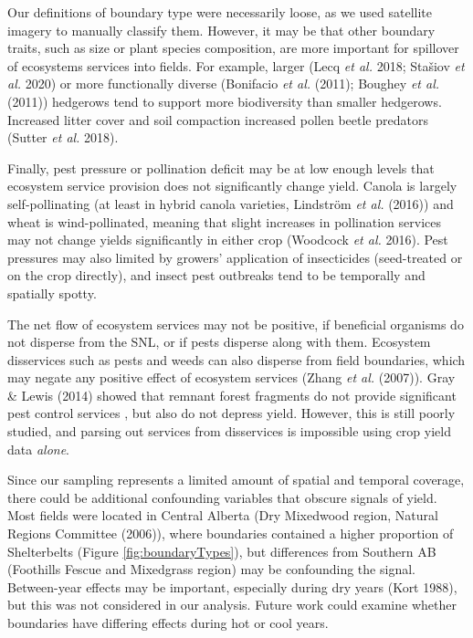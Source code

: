 \documentclass[]{elsarticle} %
\begin{document}
Our definitions of boundary type were necessarily loose, as we used satellite imagery to manually classify them.
However, it may be that other boundary traits, such as size or plant species composition, are more important for spillover of ecosystems services into fields.
For example, larger (Lecq \emph{et al.} 2018; Stašiov \emph{et al.} 2020) or more functionally diverse (Bonifacio \emph{et al.} (2011); Boughey \emph{et al.} (2011)) hedgerows tend to support more biodiversity than smaller hedgerows.
Increased litter cover and soil compaction increased pollen beetle predators (Sutter \emph{et al.} 2018).

Finally, pest pressure or pollination deficit may be at low enough levels that ecosystem service provision does not significantly change yield.
Canola is largely self-pollinating (at least in hybrid canola varieties, Lindström \emph{et al.} (2016)) and wheat is wind-pollinated, meaning that slight increases in pollination services may not change yields significantly in either crop (Woodcock \emph{et al.} 2016).
Pest pressures may also limited by growers' application of insecticides (seed-treated or on the crop directly), and insect pest outbreaks tend to be temporally and spatially spotty.

The net flow of ecosystem services may not be positive, if beneficial organisms do not disperse from the SNL, or if pests disperse along with them.
Ecosystem disservices such as pests and weeds can also disperse from field boundaries, which may negate any positive effect of ecosystem services (Zhang \emph{et al.} (2007)).
Gray \& Lewis (2014) showed that remnant forest fragments do not provide significant pest control services , but also do not depress yield.
However, this is still poorly studied, and parsing out services from disservices is impossible using crop yield data \emph{alone}.

Since our sampling represents a limited amount of spatial and temporal coverage, there could be additional confounding variables that obscure signals of yield.
Most fields were located in Central Alberta (Dry Mixedwood region, Natural Regions Committee (2006)), where boundaries contained a higher proportion of Shelterbelts (Figure \ref{fig:boundaryTypes}), but differences from Southern AB (Foothills Fescue and Mixedgrass region) may be confounding the signal.
Between-year effects may be important, especially during dry years (Kort 1988), but this was not considered in our analysis.
Future work could examine whether boundaries have differing effects during hot or cool years.
\end{document}
